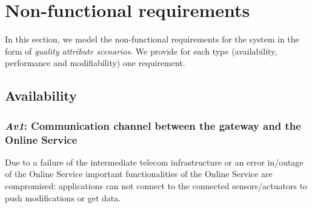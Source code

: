 \chapter{Non-functional requirements}\label{sec:non-functional}
In this section, we model the non-functional requirements for the system in the
form of \emph{quality attribute scenarios}. We provide for each type
(availability, performance and modifiability) one requirement.

\section{Availability}
\subsection{\emph{Av1}: Communication channel between the gateway and the Online Service}
Due to a failure of the intermediate telecom infrastructure or an error in/outage of the Online Service important functionalities of the Online Service are compromised: applications can not connect to the connected sensors/actuators to push modifications or get data.
